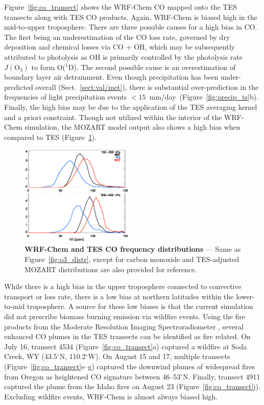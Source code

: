 Figure~\ref{fig:co_transect} shows the WRF-Chem
CO mapped onto the TES transects along with TES CO products. Again, WRF-Chem is
biased high in the mid-to-upper troposphere. There are three possible causes for a high
bias in CO. The first being an underestimation of the CO loss rate, governed by dry deposition
and chemical losses via CO + OH, which may be subsequently attributed to photolysis
as OH is primarily controlled by the photolysis rate $J(\mathrm{O}_3)$ to form O($^1$D). The second
possible cause is an overestimation of boundary layer air detrainment. Even though
precipitation has been under-predicted overall (Sect.~\ref{sect:val/met}), there is
substantial over-prediction in the frequencies of light precipitation events
$<15$~mm/day~(Figure~\ref{fig:precip_ts}b). Finally, the high bias may be due to the
application of the TES averaging kernel and a priori constraint. Though not utilized
within the interior of the WRF-Chem simulation, the MOZART model output also
shows a high bias when compared to TES (Figure~\ref{fig:co_distr}).

\begin{figure}
	\centering
	\begin{singlespacing}
	\includegraphics[width=0.48\textwidth]{Figures/co/co_teswrfhist.eps}
	\caption[WRF-Chem and TES CO frequency distributions]{{\small\textbf{WRF-Chem and TES CO frequency distributions} ---
	Same as Figure~\ref{fig:o3_distr}, except for carbon monoxide and TES-adjusted MOZART distributions are also provided for reference.}}
	\label{fig:co_distr}
	\end{singlespacing}
\end{figure}

While there is a high bias in the upper troposphere connected to convective transport
or loss rate, there is a low bias at northern latitudes within the lower-to-mid troposphere.
A source for these low biases is that the current simulation did not prescribe biomass
burning emission via wildfire events. Using the fire products from the Moderate
Resolution Imaging Spectroradiometer \citep[MODIS;][]{Justice:2002zr}, several
enhanced CO plumes in the TES transects can be identified as fire related. On July
16, transect 4534 (Figure~\ref{fig:co_transect}a) captured a wildfire at Soda Creek, WY
(43.5$^\circ$N, 110.2$^\circ$W). On August 15 and 17, multiple transects
(Figure~\ref{fig:co_transect}e--g) captured the downwind plumes of widespread fires from
Oregon as heightened CO signature between 46--53$^\circ$N. Finally, transect
4911 captured the plume from the Idaho fires on August 23 (Figure~\ref{fig:co_transect}j).
Excluding wildfire events, WRF-Chem is almost always biased high.


